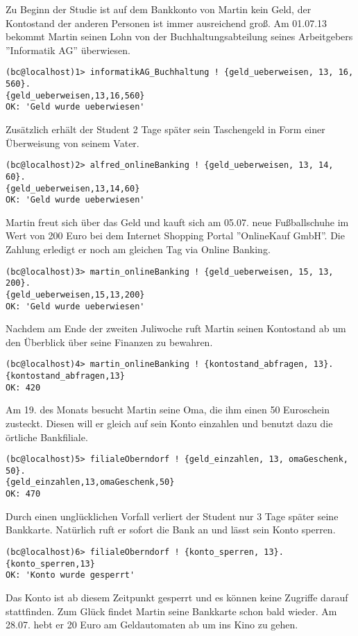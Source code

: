 Zu Beginn der Studie ist auf dem Bankkonto von Martin kein Geld, der Kontostand der anderen Personen ist immer ausreichend groß. Am 01.07.13 bekommt Martin seinen Lohn von der Buchhaltungsabteilung seines Arbeitgebers ''Informatik AG'' überwiesen. 
\begin{lstlisting}
(bc@localhost)1> informatikAG_Buchhaltung ! {geld_ueberweisen, 13, 16, 560}.    
{geld_ueberweisen,13,16,560}
OK: 'Geld wurde ueberwiesen'
\end{lstlisting}
Zusätzlich erhält der Student 2 Tage später sein Taschengeld in Form einer Überweisung von seinem Vater.
\begin{lstlisting}
(bc@localhost)2> alfred_onlineBanking ! {geld_ueberweisen, 13, 14, 60}.        
{geld_ueberweisen,13,14,60}
OK: 'Geld wurde ueberwiesen'
\end{lstlisting}
Martin freut sich über das Geld und kauft sich am 05.07. neue Fußballschuhe im Wert von 200 Euro bei dem Internet Shopping Portal ''OnlineKauf GmbH''. Die Zahlung erledigt er noch am gleichen Tag via Online Banking.
\begin{lstlisting}
(bc@localhost)3> martin_onlineBanking ! {geld_ueberweisen, 15, 13, 200}.        
{geld_ueberweisen,15,13,200}              
OK: 'Geld wurde ueberwiesen'
\end{lstlisting}
Nachdem am Ende der zweiten Juliwoche ruft Martin seinen Kontostand ab um den Überblick über seine Finanzen zu bewahren.
\begin{lstlisting}
(bc@localhost)4> martin_onlineBanking ! {kontostand_abfragen, 13}.         
{kontostand_abfragen,13}
OK: 420
\end{lstlisting}
Am 19. des Monats besucht Martin seine Oma, die ihm einen 50 Euroschein zusteckt. Diesen will er gleich auf sein Konto einzahlen und benutzt dazu die örtliche Bankfiliale.
\begin{lstlisting}
(bc@localhost)5> filialeOberndorf ! {geld_einzahlen, 13, omaGeschenk, 50}.
{geld_einzahlen,13,omaGeschenk,50}
OK: 470  
\end{lstlisting}
Durch einen unglücklichen Vorfall verliert der Student nur 3 Tage später seine Bankkarte. Natürlich ruft er sofort die Bank an und lässt sein Konto sperren.
\begin{lstlisting}
(bc@localhost)6> filialeOberndorf ! {konto_sperren, 13}.
{konto_sperren,13}
OK: 'Konto wurde gesperrt'
\end{lstlisting}
Das Konto ist ab diesem Zeitpunkt gesperrt und es können keine Zugriffe darauf stattfinden. Zum Glück findet Martin seine Bankkarte schon bald wieder. Am 28.07. hebt er 20 Euro am Geldautomaten ab um ins Kino zu gehen.
